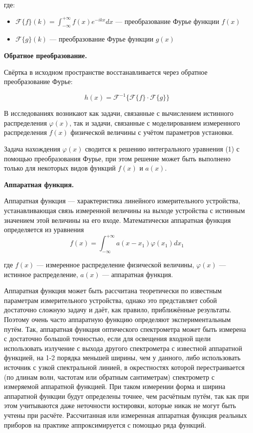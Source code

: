 \documentclass[a4paper]{article}
\begin{document}
где:
\begin{itemize}
\item $\mathcal{F}\{f\}(k) = \int_{-\infty}^{+\infty} f(x)e^{-ikx}dx$ --- преобразование Фурье функции $f(x)$
\item $\mathcal{F}\{g\}(k)$ --- преобразование Фурье функции $g(x)$
\end{itemize}

\textbf{Обратное преобразование.}

Свёртка в исходном пространстве восстанавливается через обратное преобразование Фурье:

\begin{equation}
h(x) = \mathcal{F}^{-1}\{\mathcal{F}\{f\} \cdot \mathcal{F}\{g\}\}
\end{equation}

В исследованиях возникают как задачи, связанные с вычислением истинного распределения $\varphi \left(x\right)$, так и задачи, связанные с моделированием измеренного распределения $f\left(x\right)$ физической величины с учётом параметров установки.

Задача нахождения $\varphi \left(x\right)$ сводится к решению интегрального уравнения (1) с помощью преобразования Фурье, при этом решение может быть выполнено только для некоторых видов функций $f\left(x\right)$ и 
$a\left(x\right)$.

\textbf{Аппаратная функция.}

Аппаратная функция --- характеристика линейного измерительного устройства, устанавливающая связь измеренной величины на выходе устройства с истинным значением этой величины на его входе. Математически аппаратная функция определяется из уравнения 
\begin{equation}
f(x) = \int_{-\infty}^{+\infty} a(x-x_1)\varphi(x_1)dx_1
\end{equation}

где $f(x)$ --- измеренное распределение физической величины, $\varphi(x)$ --- истинное распределение, $a(x)$ --- аппаратная функция.

Аппаратная функция может быть рассчитана теоретически по известным параметрам измерительного устройства, однако это представляет собой достаточно сложную задачу и даёт, как правило, приближённые результаты. Поэтому очень часто аппаратную функцию определяют экспериментальным путём. Так, аппаратная функция оптического спектрометра может быть измерена с достаточно большой точностью, если для освещения входной щели использовать излучение с выхода другого спектрометра с известной аппаратной функцией, на 1-2 порядка меньшей ширины, чем у данного, либо использовать источник с узкой спектральной линией, в окрестностях которой перестраивается (по длинам волн, частотам или обратным сантиметрам)
спектрометр с измеряемой аппаратной функцией. При таком измерении форма и ширина аппаратной функции будут определены точнее, чем расчётным путём, так как при этом учитываются даже неточности юстировки, которые никак не могут быть учтены при расчёте. Рассчитанная или измеренная аппаратная функция реальных приборов на практике аппроксимируется с помощью ряда функций.
\end{document}
